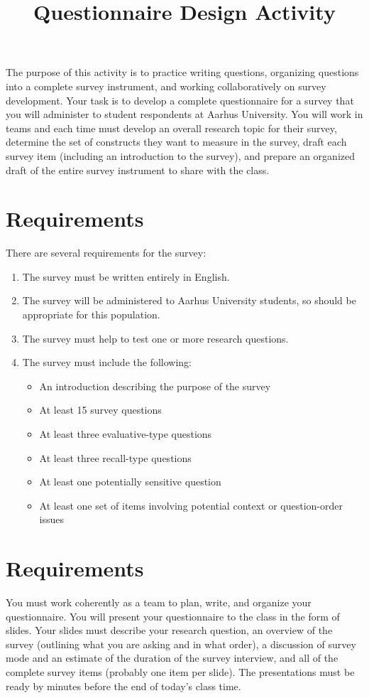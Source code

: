 \documentclass[12pt, a4]{article}
\title{Questionnaire Design Activity\vspace{-2em}}
\author{}
\date{}
\begin{document}
\maketitle

\noindent The purpose of this activity is to practice writing questions, organizing questions into a complete survey instrument, and working collaboratively on survey development. Your task is to develop a complete questionnaire for a survey that you will administer to student respondents at Aarhus University. You will work in teams and each time must develop an overall research topic for their survey, determine the set of constructs they want to measure in the survey, draft each survey item (including an introduction to the survey), and prepare an organized draft of the entire survey instrument to share with the class.

\section{Requirements}
There are several requirements for the survey:
\begin{enumerate}
    \item The survey must be written entirely in English.
    \item The survey will be administered to Aarhus University students, so should be appropriate for this population.
    \item The survey must help to test one or more research questions.
    \item The survey must include the following:
        \begin{itemize}
            \item An introduction describing the purpose of the survey
            \item At least 15 survey questions
            \item At least three evaluative-type questions
            \item At least three recall-type questions
            \item At least one potentially sensitive question
            \item At least one set of items involving potential context or question-order issues
        \end{itemize}
\end{enumerate}

\section{Requirements}
You must work coherently as a team to plan, write, and organize your questionnaire. You will present your questionnaire to the class in the form of slides. Your slides must describe your research question, an overview of the survey (outlining what you are asking and in what order), a discussion of survey mode and an estimate of the duration of the survey interview, and all of the complete survey items (probably one item per slide). The presentations must be ready by minutes before the end of today's class time.
\end{document}

